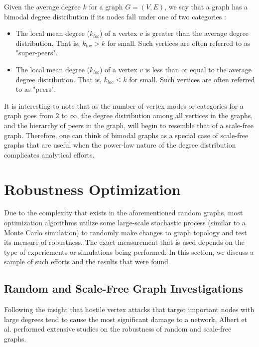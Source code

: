 \documentclass[doc]{apa}%
\begin{document}
Given the average degree $k$ for a graph $G = (V,E)$, we say that a graph has a bimodal degree distribution if its nodes fall under one of two categories \cite{bimodal}:
\begin{itemize}
	\item The local mean degree ($k_{loc}$) of a vertex $v$ is greater than the average degree distribution. That is, $k_{loc} > k$ for small. Such vertices are often referred to as "super-peers".
	\item The local mean degree ($k_{loc}$) of a vertex $v$ is less than or equal to the average degree distribution. That is, $k_{loc} \leq k$ for small. Such vertices are often referred to as "peers".
\end{itemize}
It is interesting to note that as the number of vertex modes or categories for a graph goes from $2$ to $\infty$, the degree distribution among all vertices in the graphs, and the hierarchy of peers in the graph, will begin to resemble that of a scale-free graph. Therefore, one can think of bimodal graphs as a special case of scale-free graphs that are useful when the power-law nature of the degree distribution complicates analytical efforts.

\section{Robustness Optimization}

Due to the complexity that exists in the aforementioned random graphs, most optimization algorithms utilize some large-scale stochastic process (similar to a Monte Carlo simulation) to randomly make changes to graph topology and test its measure of robustness. The exact measurement that is used depends on the type of experiements or simulations being performed. In this section, we discuss a sample of such efforts and the results that were found.

\subsection{Random and Scale-Free Graph Investigations}


Following the insight that hostile vertex attacks that target important nodes with large degrees tend to cause the most significant damage to a network, Albert et al. performed extensive studies on the robustness of random and scale-free graphs. 
\end{document}
